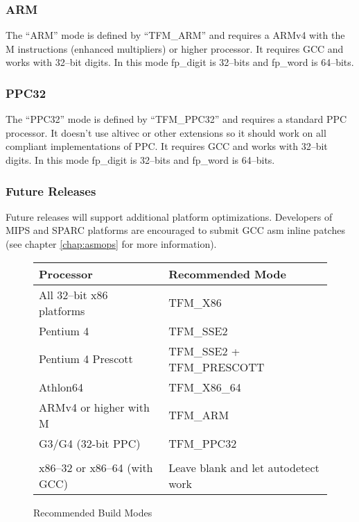 \documentclass[b5paper]{book}
\begin{document}
\subsubsection{ARM}  The ``ARM'' mode is defined by ``TFM\_ARM'' and requires a ARMv4 with the M instructions (enhanced 
multipliers) or higher processor.  It requires GCC and works with 32--bit digits.  In this mode fp\_digit is 32--bits and 
fp\_word is 64--bits.

\subsubsection{PPC32} The ``PPC32'' mode is defined by ``TFM\_PPC32'' and requires a standard PPC processor.  It doesn't 
use altivec or other extensions so it should work on all compliant implementations of PPC.  It requires GCC and works
with 32--bit digits.  In this mode fp\_digit is 32--bits and fp\_word is 64--bits.

\subsubsection{Future Releases}  Future releases will support additional platform optimizations.
Developers of MIPS and SPARC platforms are encouraged to submit GCC asm inline patches 
(see chapter \ref{chap:asmops} for more information).

\begin{figure}[here]
\begin{small}
\begin{center}
\begin{tabular}{|l|l|}
\hline \textbf{Processor} & \textbf{Recommended Mode} \\
\hline All 32--bit x86 platforms  & TFM\_X86 \\
\hline Pentium 4                  & TFM\_SSE2 \\
\hline Pentium 4 Prescott         & TFM\_SSE2 + TFM\_PRESCOTT \\
\hline Athlon64                   & TFM\_X86\_64 \\
\hline ARMv4 or higher with M     & TFM\_ARM \\
\hline G3/G4 (32-bit PPC)         & TFM\_PPC32 \\
\hline &\\
\hline x86--32 or x86--64 (with GCC) & Leave blank and let autodetect work \\
\hline
\end{tabular}
\caption{Recommended Build Modes}
\end{center}
\end{small}
\end{figure}
\end{document}
